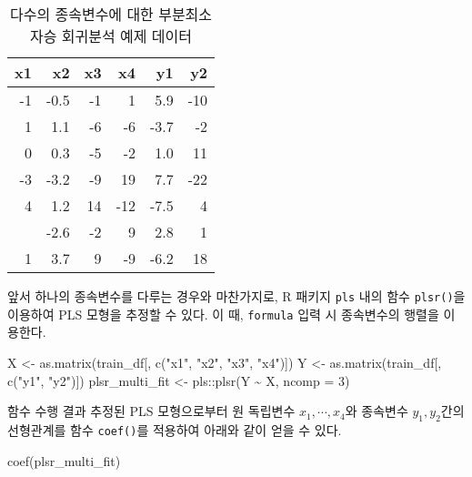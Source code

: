 \documentclass[
]{book}
\newenvironment{Shaded}{\begin{snugshade}}{\end{snugshade}}
\newcommand{\AttributeTok}[1]{\textcolor[rgb]{0.77,0.63,0.00}{#1}}
\newcommand{\DecValTok}[1]{\textcolor[rgb]{0.00,0.00,0.81}{#1}}
\newcommand{\FunctionTok}[1]{\textcolor[rgb]{0.00,0.00,0.00}{#1}}
\newcommand{\NormalTok}[1]{#1}
\newcommand{\OtherTok}[1]{\textcolor[rgb]{0.56,0.35,0.01}{#1}}
\newcommand{\SpecialCharTok}[1]{\textcolor[rgb]{0.00,0.00,0.00}{#1}}
\newcommand{\StringTok}[1]{\textcolor[rgb]{0.31,0.60,0.02}{#1}}
\begin{document}
\begin{table}

\caption{\label{tab:plsr-multivariate-example-data}다수의 종속변수에 대한 부분최소자승 회귀분석 예제 데이터}
\centering
\begin{tabular}[t]{rrrrrr}
\toprule
x1 & x2 & x3 & x4 & y1 & y2\\
\midrule
-1 & -0.5 & -1 & 1 & 5.9 & -10\\
1 & 1.1 & -6 & -6 & -3.7 & -2\\
0 & 0.3 & -5 & -2 & 1.0 & 11\\
-3 & -3.2 & -9 & 19 & 7.7 & -22\\
4 & 1.2 & 14 & -12 & -7.5 & 4\\
\addlinespace
-2 & -2.6 & -2 & 9 & 2.8 & 1\\
1 & 3.7 & 9 & -9 & -6.2 & 18\\
\bottomrule
\end{tabular}
\end{table}

앞서 하나의 종속변수를 다루는 경우와 마찬가지로, R 패키지 \texttt{pls} 내의 함수 \texttt{plsr()}을 이용하여 PLS 모형을 추정할 수 있다. 이 때, \texttt{formula} 입력 시 종속변수의 행렬을 이용한다.

\begin{Shaded}
\begin{Highlighting}[]
\NormalTok{X }\OtherTok{\textless{}{-}} \FunctionTok{as.matrix}\NormalTok{(train\_df[, }\FunctionTok{c}\NormalTok{(}\StringTok{"x1"}\NormalTok{, }\StringTok{"x2"}\NormalTok{, }\StringTok{"x3"}\NormalTok{, }\StringTok{"x4"}\NormalTok{)])}
\NormalTok{Y }\OtherTok{\textless{}{-}} \FunctionTok{as.matrix}\NormalTok{(train\_df[, }\FunctionTok{c}\NormalTok{(}\StringTok{"y1"}\NormalTok{, }\StringTok{"y2"}\NormalTok{)])}
\NormalTok{plsr\_multi\_fit }\OtherTok{\textless{}{-}}\NormalTok{ pls}\SpecialCharTok{::}\FunctionTok{plsr}\NormalTok{(Y }\SpecialCharTok{\textasciitilde{}}\NormalTok{ X, }\AttributeTok{ncomp =} \DecValTok{3}\NormalTok{)}
\end{Highlighting}
\end{Shaded}

함수 수행 결과 추정된 PLS 모형으로부터 원 독립변수 \(x_1, \cdots, x_4\)와 종속변수 \(y_1, y_2\)간의 선형관계를 함수 \texttt{coef()}를 적용하여 아래와 같이 얻을 수 있다.

\begin{Shaded}
\begin{Highlighting}[]
\FunctionTok{coef}\NormalTok{(plsr\_multi\_fit)}
\end{Highlighting}
\end{Shaded}
\end{document}
